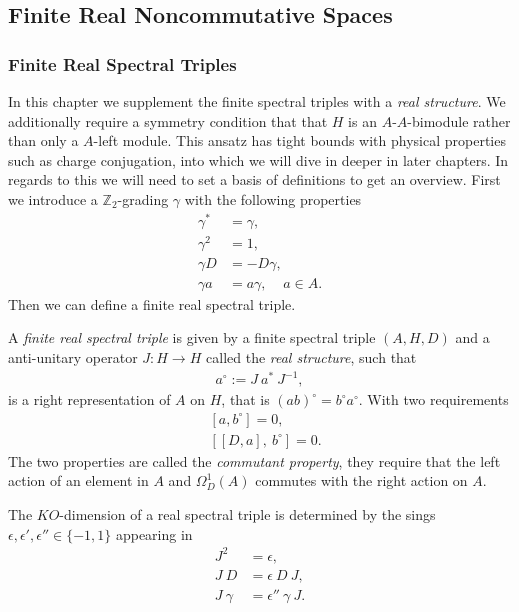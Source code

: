 \subsection{Finite Real Noncommutative Spaces\label{sec:3}}
\subsubsection{Finite Real Spectral Triples}
In this chapter we supplement the finite spectral triples with a \textit{real
structure}. We additionally require a symmetry condition that that $H$ is an
$A$-$A$-bimodule rather than only a $A$-left module. This ansatz has tight
bounds with physical properties such as charge conjugation, into which we will
dive in deeper in later chapters. In regards to this we will need to set a basis
of definitions to get an overview.
First we introduce a $\mathbb{Z}_2$-grading $\gamma$ with the following
properties
\begin{align}
    \gamma ^* &= \gamma, \\
    \gamma ^2 &= 1, \\
    \gamma D &= - D \gamma,\\
    \gamma a &= a \gamma, \;\;\;\; a\in A.
\end{align}
Then we can define a finite real spectral triple.
\begin{mydefinition}
    A \textit{finite real spectral triple} is given by a finite spectral
    triple $(A, H, D)$ and a anti-unitary operator $J:H\rightarrow H$ called
    the \textit{real structure}, such that
    \begin{align}
        a^\circ := J\ a^*\ J^{-1},
    \end{align}
    is a right representation of $A$ on $H$, that is $(ab)^\circ = b^\circ
    a^\circ$. With two requirements
    \begin{align}
        &[a, b^\circ] = 0,\\
        &[[D, a],\ b^\circ] = 0.
    \end{align}
    The two properties are called the \textit{commutant property}, they
    require that the left action of an element in $A$ and $\Omega _D^1(A)$ commutes with the right
    action on $A$.
\end{mydefinition}
\begin{mydefinition}
    The $KO$-dimension of a real spectral triple is determined by the sings
    $\epsilon, \epsilon ' ,\epsilon '' \in \{-1, 1\}$ appearing in
    \begin{align}
        J^2 &= \epsilon, \\
        J\ D &= \epsilon \ D\ J,\\
        J\ \gamma &= \epsilon''\ \gamma\ J.
    \end{align}
\end{mydefinition}
